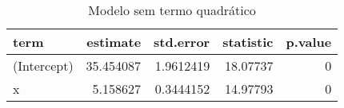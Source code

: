 \begin{table}

\caption{\label{tab:tabela1_exemplo4}Modelo sem termo quadrático}
\centering
\begin{tabular}[t]{l|r|r|r|r}
\hline
term & estimate & std.error & statistic & p.value\\
\hline
(Intercept) & 35.454087 & 1.9612419 & 18.07737 & 0\\
\hline
x & 5.158627 & 0.3444152 & 14.97793 & 0\\
\hline
\end{tabular}
\end{table}
